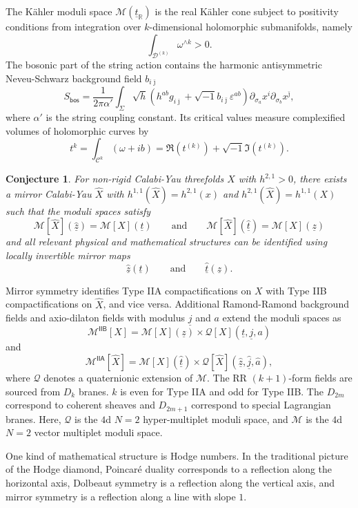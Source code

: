 \documentclass[10pt,oldfontcommands,oneside]{memoir}
\newtheorem{conj}[thm]{Conjecture}
\theoremstyle{definition}
\theoremstyle{remark}
\theoremstyle{plain}
\theoremstyle{definition}
\theoremstyle{remark}
\newcommand{\R}{\mathbb{R}}
\newcommand{\ep}{\varepsilon}
\newcommand{\mc}[1]{\mathcal{#1}}
\newcommand{\ut}{\ul{t}}
\newcommand{\uz}{\ul{z}}
\newcommand{\ur}{\ul{j}}
\newcommand{\ms}[1]{\mathsf{#1}}
\newcommand{\ul}[1]{\underline{#1}}
\newcommand{\1}{\mathbf{1}}
\newcommand{\2}{\mathbf{2}}
\newcommand{\3}{\mathbf{3}}
\newcommand{\IIA}{\ms{IIA}}
\newcommand{\IIB}{\ms{IIB}}
\begin{document}
The K\"ahler moduli space $\mc{M}(\ut_{\R})$ is the real K\"ahler cone subject to positivity conditions from integration over $k$-dimensional holomorphic submanifolds, namely
\[ \int_{\mc{D}^{(k)}} \omega^{\wedge k} > 0. \]
The bosonic part of the string action contains the harmonic antisymmetric Neveu-Schwarz background field $b_{i\bar{\jmath}}$
\[ S_{\ms{bos}} =\frac{1}{2\pi\alpha'} \int_{\Sigma} \sqrt{h} (h^{ab} g_{i\bar{\jmath}} + \sqrt{-1} b_{i\bar{\jmath}}\ep^{ab}) \partial_{\sigma_a} x^i \partial_{\sigma_b} x^{ \bar{\jmath} }, \]
where $\alpha'$ is the string coupling constant. Its critical values measure complexified volumes of holomorphic curves by
\[ t^k = \int_{\mc{C}^k} (\omega + ib) = \Re(t^(k)) + \sqrt{-1} \Im(t^{(k)}). \]


\begin{conj}
    For non-rigid Calabi-Yau threefolds $X$ with $h^{2,1} > 0$, there exists a mirror Calabi-Yau $\hat{X}$ with $h^{1,1}(\hat{X})= h^{2,1}(x)$ and $h^{2,1}(\hat{X}) = h^{1,1}(X)$ such that the moduli spaces satisfy
    \[ \mc{M}[\hat{X}](\hat{\uz}) = \mc{M}[X](\ut) \qquad \text{and} \qquad \mc{M}[\hat{X}](\hat{\ut}) = \mc{M}[X](\uz) \]
    and all relevant physical and mathematical structures can be identified using locally invertible mirror maps
    \[ \hat{\uz}(\ut) \qquad \text{and} \qquad \hat{\ut}(\uz). \]
\end{conj}

Mirror symmetry identifies Type IIA compactifications on $X$ with Type IIB compactifications on $\hat{X}$, and vice versa. Additional Ramond-Ramond background fields and axio-dilaton fields with modulus $\ur$ and $a$ extend the moduli spaces as
\[ \mc{M}^{\IIB}[X] = \mc{M}[X](\uz) \times \mc{Q}[X](\ut, \ur, a) \]
and 
\[ \mc{M}^{\IIA}[\hat{X}] = \mc{M}[X](\hat{\ut}) \times \mc{Q}[\hat{X}](\hat{\uz}, \hat{\ur}, \hat{a}), \]
where $\mc{Q}$ denotes a quaternionic extension of $\mc{M}$. The RR $(k+1)$-form fields are sourced from $D_k$ branes. $k$ is even for Type IIA and odd for Type IIB. The $D_{2m}$ correspond to coherent sheaves and $D_{2m+1}$ correspond to special Lagrangian branes. Here, $\mc{Q}$ is the $4$d $N=2$ hyper-multiplet moduli space, and $\mc{M}$ is the $4$d $N=2$ vector multiplet moduli space.

One kind of mathematical structure is Hodge numbers. In the traditional picture of the Hodge diamond, Poincar\'e duality corresponds to a reflection along the horizontal axis, Dolbeaut symmetry is a reflection along the vertical axis, and mirror symmetry is a reflection along a line with slope $1$.
\end{document}
